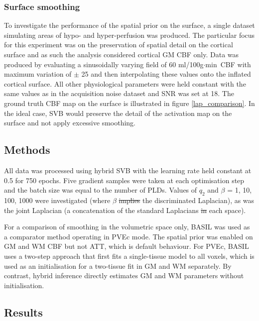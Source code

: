 \documentclass[12pt]{report}
\newcommand{\cbf}{ml/100g$\cdot$min}
\providecommand{\DIFaddtex}[1]{{\protect\color{blue}\uwave{#1}}} %
\providecommand{\DIFdeltex}[1]{{\protect\color{red}\sout{#1}}}                      %
\providecommand{\DIFaddbegin}{} %
\providecommand{\DIFaddend}{} %
\providecommand{\DIFdelbegin}{} %
\providecommand{\DIFdelend}{} %
\providecommand{\DIFadd}[1]{\texorpdfstring{\DIFaddtex{#1}}{#1}} %
\providecommand{\DIFdel}[1]{\texorpdfstring{\DIFdeltex{#1}}{}} %
\newcommand{\DIFscaledelfig}{0.5}
\newlength{\DIFdelgraphicswidth} %
\newlength{\DIFdelgraphicsheight} %
\newcommand{\DIFaddincludegraphics}[2][]{{\color{blue}\fbox{\DIFOincludegraphics[#1]{#2}}}} %
\newcommand{\DIFdelincludegraphics}[2][]{%
\sbox{\DIFdelgraphicsbox}{\DIFOincludegraphics[#1]{#2}}%
\settoboxwidth{\DIFdelgraphicswidth}{\DIFdelgraphicsbox} %
\settoboxtotalheight{\DIFdelgraphicsheight}{\DIFdelgraphicsbox} %
\scalebox{\DIFscaledelfig}{%
\parbox[b]{\DIFdelgraphicswidth}{\usebox{\DIFdelgraphicsbox}\\[-\baselineskip] \rule{\DIFdelgraphicswidth}{0em}}\llap{\resizebox{\DIFdelgraphicswidth}{\DIFdelgraphicsheight}{%
\setlength{\unitlength}{\DIFdelgraphicswidth}%
\begin{picture}(1,1)%
\thicklines\linethickness{2pt} %
{\color[rgb]{1,0,0}\put(0,0){\framebox(1,1){}}}%
{\color[rgb]{1,0,0}\put(0,0){\line( 1,1){1}}}%
{\color[rgb]{1,0,0}\put(0,1){\line(1,-1){1}}}%
\end{picture}%
}\hspace*{3pt}}} %
} %
\DeclareRobustCommand{\DIFaddbegin}{\DIFOaddbegin \let\includegraphics\DIFaddincludegraphics} %
\DeclareRobustCommand{\DIFaddend}{\DIFOaddend \let\includegraphics\DIFOincludegraphics} %
\DeclareRobustCommand{\DIFdelbegin}{\DIFOdelbegin \let\includegraphics\DIFdelincludegraphics} %
\DeclareRobustCommand{\DIFdelend}{\DIFOaddend \let\includegraphics\DIFOincludegraphics} %
\begin{document}
\subsubsection{Surface smoothing}

To investigate the performance of the spatial prior on the surface, a single dataset simulating areas of hypo- and hyper-perfusion was produced. The particular focus for this experiment was on the preservation of spatial detail on the cortical surface and as such the analysis considered cortical GM CBF only. Data was produced by evaluating a sinusoidally varying field of 60 \cbf\ CBF with maximum variation of $\pm$ 25 and then interpolating these values onto the inflated cortical surface. All other physiological parameters were held constant with the same values as in the acquisition noise dataset and SNR was set at 18. The ground truth CBF map on the surface is illustrated in figure \ref{lap_comparison}. In the ideal case, SVB would preserve the detail of the activation map on the surface and not apply excessive smoothing. 

\subsection{Methods}

All data was processed using hybrid SVB with the learning rate held constant at 0.5 for 750 epochs. Five gradient samples were taken at each optimisation step and the batch size was equal to the number of PLDs. Values of $q_2$ and $\beta$ = 1, 10, 100, 1000 were investigated (where $\beta$ \DIFdelbegin \DIFdel{implies }\DIFdelend \DIFaddbegin \DIFadd{pertains to }\DIFaddend the discriminated Laplacian), as was the joint Laplacian (a concatenation of the standard Laplacians \DIFdelbegin \DIFdel{in }\DIFdelend \DIFaddbegin \DIFadd{for }\DIFaddend each space). 

For a comparison of smoothing in the volumetric space only, BASIL was used as a comparator method operating in PVEc mode. The spatial prior was enabled on GM and WM CBF but not ATT, which is default behaviour. For PVEc, BASIL uses a two-step approach that first fits a single-tissue model to all voxels, which is used as an initialisation for a two-tissue fit in GM and WM separately. By contrast, hybrid inference directly estimates GM and WM parameters without initialisation. 

\subsection{Results}
\end{document}
